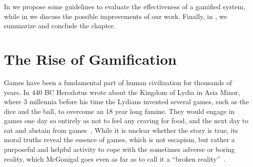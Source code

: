 In  we propose some guidelines to evaluate the effectiveness of a gamified system, while in  we discuss the possible improvements of our work.
Finally, in , we summarize and conclude the chapter.

\newpage

%
%
%
%
%
%



\section{The Rise of Gamification}\label{sec:gamification-intro}

Games have been a fundamental part of human civilization for thousands of years.
In 440 BC Herodotus wrote about the Kingdom of Lydia in Asia Minor, where 3 millennia before his time the Lydians invented several games, such as the dice and the ball, to overcome an 18 year long famine.
They would engage in games one day so entirely as not to feel any craving for food, and the next day to eat and abstain from games~\cite{Hero440a}.
While it is unclear whether the story is true, its moral truths reveal the essence of games, which is not escapism, but rather a purposeful and helpful activity to cope with the sometimes adverse or boring reality, which McGonigal goes even as far as to call it a ``broken reality''~\cite{McGo2011a}.

